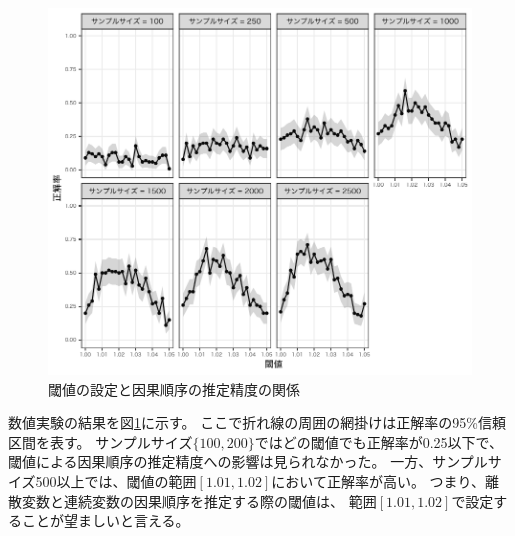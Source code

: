 \begin{figure}
  \includegraphics[width=13cm, bb=9 9 358 434]{./picture/plot_threshold.pdf}
  \caption{閾値の設定と因果順序の推定精度の関係}
  \label{fig:plot_threshold}
\end{figure}

数値実験の結果を図\ref{fig:plot_threshold}に示す。
ここで折れ線の周囲の網掛けは正解率の95\%信頼区間を表す。
サンプルサイズ$\{ 100, 200 \}$ではどの閾値でも正解率が0.25以下で、
閾値による因果順序の推定精度への影響は見られなかった。
一方、サンプルサイズ500以上では、閾値の範囲$[1.01, 1.02]$において正解率が高い。
つまり、離散変数と連続変数の因果順序を推定する際の閾値は、
範囲$[1.01, 1.02]$で設定することが望ましいと言える。
